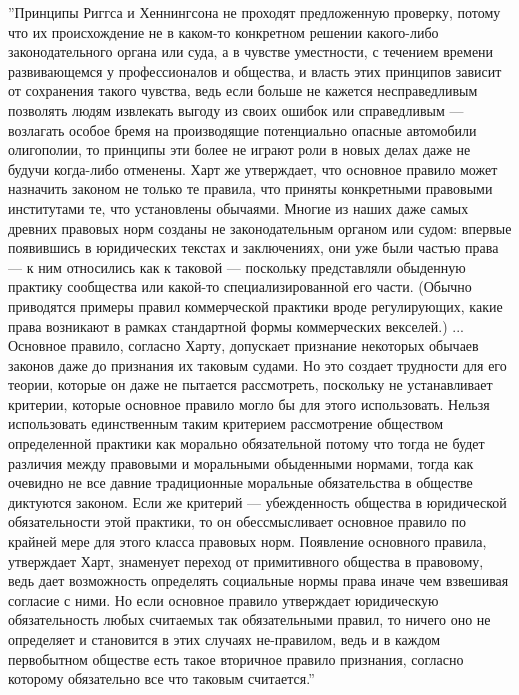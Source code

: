 \documentclass[11pt]{book}
\begin{document}
''Принципы Риггса и Хеннингсона не проходят предложенную проверку, потому что их происхождение не в каком-то конкретном решении какого-либо законодательного органа или суда, а в чувстве уместности, с течением времени развивающемся у профессионалов и общества, и власть этих принципов зависит от сохранения такого чувства, ведь если больше не кажется несправедливым позволять людям извлекать выгоду из своих ошибок или справедливым --- возлагать особое бремя на производящие потенциально опасные автомобили олигополии, то принципы эти более не играют роли в новых делах даже не будучи когда-либо отменены. Харт же утверждает, что основное правило может назначить законом не только те правила, что приняты конкретными правовыми институтами те, что установлены обычаями. Многие из наших даже самых древних правовых норм созданы не законодательным органом или судом: впервые появившись в юридических текстах и заключениях, они уже были частью права --- к ним относились как к таковой --- поскольку представляли обыденную практику сообщества или какой-то специализированной его части. (Обычно приводятся примеры правил коммерческой практики вроде регулирующих, какие права возникают в рамках стандартной формы коммерческих векселей.) ... Основное правило, согласно Харту, допускает признание некоторых обычаев законов даже до признания их таковым судами. Но это создает трудности для его теории, которые он даже не пытается рассмотреть, поскольку не устанавливает критерии, которые основное правило могло бы для этого использовать. Нельзя использовать единственным таким критерием рассмотрение обществом определенной практики как морально обязательной потому что тогда не будет различия между правовыми и моральными обыденными нормами, тогда как очевидно не все давние традиционные моральные обязательства в обществе диктуются законом. Если же критерий --- убежденность общества в юридической обязательности этой практики, то он обессмысливает основное правило по крайней мере для этого класса правовых норм. Появление основного правила, утверждает Харт, знаменует переход от примитивного общества в правовому, ведь дает возможность определять социальные нормы права иначе чем взвешивая согласие с ними. Но если основное правило утверждает юридическую обязательность любых считаемых так обязательными правил, то ничего оно не определяет и становится в этих случаях не-правилом, ведь и в каждом первобытном обществе есть такое вторичное правило признания, согласно которому обязательно все что таковым считается.''

\smallskip
\end{document}

